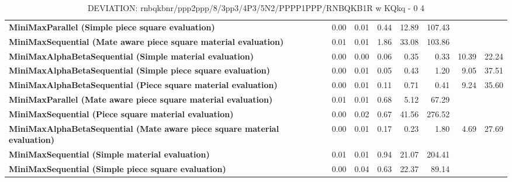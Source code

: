 \begin{table}[H]
{\begin{tabular}{|p{8cm}|*{7}{r|}}
\rowcolor[HTML]{FFFFFF}
\textbf{MiniMaxParallel (Simple piece square evaluation)}               & 0.00 & 0.01 & 0.44 & 12.89 & 107.43 &  &  \\

\rowcolor[HTML]{EFEFEF}
\textbf{MiniMaxSequential (Mate aware piece square material evaluation)}               & 0.01 & 0.01 & 1.86 & 33.08 & 103.86 &  &  \\

\rowcolor[HTML]{FFFFFF}
\textbf{MiniMaxAlphaBetaSequential (Simple material evaluation)}               & 0.00 & 0.00 & 0.06 & 0.35 & 0.33 & 10.39 & 22.24 \\

\rowcolor[HTML]{EFEFEF}
\textbf{MiniMaxAlphaBetaSequential (Simple piece square evaluation)}               & 0.00 & 0.01 & 0.05 & 0.43 & 1.20 & 9.05 & 37.51 \\

\rowcolor[HTML]{FFFFFF}
\textbf{MiniMaxAlphaBetaSequential (Piece square material evaluation)}               & 0.00 & 0.01 & 0.11 & 0.71 & 0.41 & 9.24 & 35.60 \\

\rowcolor[HTML]{EFEFEF}
\textbf{MiniMaxParallel (Mate aware piece square material evaluation)}               & 0.01 & 0.01 & 0.68 & 5.12 & 67.29 &  &  \\

\rowcolor[HTML]{FFFFFF}
\textbf{MiniMaxSequential (Piece square material evaluation)}               & 0.00 & 0.02 & 0.67 & 41.56 & 276.52 &  &  \\

\rowcolor[HTML]{EFEFEF}
\textbf{MiniMaxAlphaBetaSequential (Mate aware piece square material evaluation)}               & 0.00 & 0.01 & 0.17 & 0.23 & 1.80 & 4.69 & 27.69 \\

\rowcolor[HTML]{FFFFFF}
\textbf{MiniMaxSequential (Simple material evaluation)}               & 0.01 & 0.01 & 0.94 & 21.07 & 204.41 &  &  \\

\rowcolor[HTML]{EFEFEF}
\textbf{MiniMaxSequential (Simple piece square evaluation)}               & 0.00 & 0.04 & 0.63 & 22.37 & 89.14 &  &  \\

            \hline
        \end{tabular}%
    }
    \caption{DEVIATION: rnbqkbnr/ppp2ppp/8/3pp3/4P3/5N2/PPPP1PPP/RNBQKB1R w KQkq - 0 4}
    \label{tab:simple-tactical-position-deviation}
\end{table}
